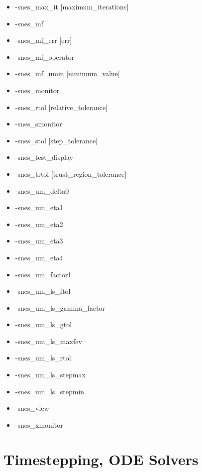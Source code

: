 \begin{itemize}
\item -snes\_max\_it [maximum\_iterations]
\item -snes\_mf
\item -snes\_mf\_err [err]
\item -snes\_mf\_operator
\item -snes\_mf\_umin [minimum\_value]
\item -snes\_monitor
\item -snes\_rtol [relative\_tolerance]
\item -snes\_smonitor
\item -snes\_stol [step\_tolerance]
\item -snes\_test\_display 
\item -snes\_trtol [trust\_region\_tolerance]
\item -snes\_um\_delta0
\item -snes\_um\_eta1
\item -snes\_um\_eta2
\item -snes\_um\_eta3
\item -snes\_um\_eta4
\item -snes\_um\_factor1
\item -snes\_um\_ls\_ftol
\item -snes\_um\_ls\_gamma\_factor
\item -snes\_um\_ls\_gtol
\item -snes\_um\_ls\_maxfev
\item -snes\_um\_ls\_rtol
\item -snes\_um\_ls\_stepmax
\item -snes\_um\_ls\_stepmin
\item -snes\_view
\item -snes\_xmonitor
\end{itemize}


{\small
\noindent

}

\section{Timestepping, ODE Solvers}

